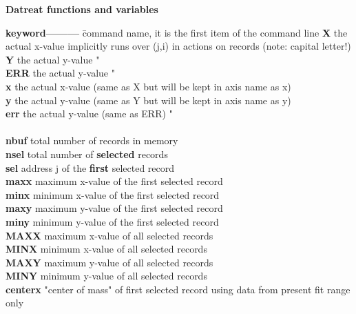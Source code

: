 \documentclass[11pt,fleqn]{book} %
\newcommand{\linespace}{\vspace{4ex}}
\begin{document}
\linespace
\color{blue}
\textbf{Datreat functions and variables}
\linespace
\begin{tabbing}
\textbf{keyword---------}  \= command name, it is the first item of the command line                    \kill
\textbf{X       } \>  the actual x-value implicitly runs over (j,i) in actions on records (note: capital letter!)   \\  
\textbf{Y       } \>  the actual y-value  "        \\  
\textbf{ERR     } \>  the actual y-value  "       \\  
\textbf{x       } \>  the actual x-value (same as X but will be kept in axis name as x)        \\  
\textbf{y       } \>  the actual y-value (same as Y but will be kept in axis name as y)         \\  
\textbf{err     } \>  the actual y-value (same as ERR) "       \\ 
 \\
\textbf{nbuf    } \>  total number of records in memory           \\  
\textbf{nsel    } \>  total number of \textbf{selected} records          \\  
\textbf{sel     } \>  address j of the \textbf{first} selected record            \\  
\textbf{maxx    } \>  maximum x-value of the first selected record            \\  
\textbf{minx    } \>  minimum x-value of the first selected record            \\  
\textbf{maxy    } \>  maximum y-value of the first selected record            \\  
\textbf{miny    } \>  minimum y-value of the first selected record {\color{green}{TBD:all sel recs}}           \\  \textbf{MAXX    } \>  maximum x-value of all selected records            \\  
\textbf{MINX    } \>  minimum x-value of all selected records            \\  
\textbf{MAXY    } \>  maximum y-value of all selected records            \\  
\textbf{MINY    } \>  minimum y-value of all selected records {\color{green}{TBD:all sel recs}}           \\  
\textbf{centerx } \>  "center of mass" of first selected record using data from present fit range only  \\  

\end{tabbing}
\end{document}
